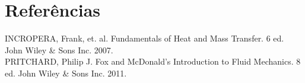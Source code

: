 \section{Referências}

\noindent INCROPERA, Frank, et. al. Fundamentals of Heat and Mass Transfer. 6 ed. John Wiley \& Sons
Inc. 2007. \\

\noindent PRITCHARD, Philip J. Fox and McDonald's Introduction to Fluid Mechanics. 8 ed. John Wiley \& Sons
Inc. 2011.